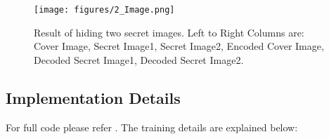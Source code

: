 \documentclass{article}
\begin{document}
\begin{figure*}[t]
\vskip 0.2in
\begin{center}
\centerline{\texttt{[image: figures/2\_Image.png]}}
\caption{Result of hiding two secret images. Left to Right Columns are: Cover Image, Secret Image1, Secret Image2, Encoded Cover Image, Decoded Secret Image1, Decoded Secret Image2.}
\label{fig:2_Image_result}
\end{center}
\vskip -0.2in
\end{figure*}

\subsection{Implementation Details}
For full code please refer \href{https://colab.research.google.com/drive/1CuvpGxHtLUu-2HnlQu5hApSY4RRbbNJ4?usp=sharing}{\color{blue}{here}}.
The training details are explained below:
\end{document}
